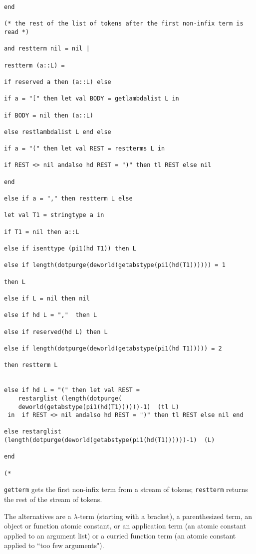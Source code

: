 \documentclass{article}
\begin{document}
\begin{verbatim}
end

(* the rest of the list of tokens after the first non-infix term is read *)

and restterm nil = nil |

restterm (a::L) = 

if reserved a then (a::L) else

if a = "[" then let val BODY = getlambdalist L in

if BODY = nil then (a::L)

else restlambdalist L end else

if a = "(" then let val REST = restterms L in

if REST <> nil andalso hd REST = ")" then tl REST else nil

end

else if a = "," then restterm L else

let val T1 = stringtype a in

if T1 = nil then a::L

else if isenttype (pi1(hd T1)) then L

else if length(dotpurge(deworld(getabstype(pi1(hd(T1)))))) = 1

then L

else if L = nil then nil

else if hd L = ","  then L

else if reserved(hd L) then L

else if length(dotpurge(deworld(getabstype(pi1(hd T1))))) = 2

then restterm L


else if hd L = "(" then let val REST = 
    restarglist (length(dotpurge(
    deworld(getabstype(pi1(hd(T1))))))-1)  (tl L)
 in  if REST <> nil andalso hd REST = ")" then tl REST else nil end

else restarglist (length(dotpurge(deworld(getabstype(pi1(hd(T1))))))-1)  (L)

end

(*

\end{verbatim}


{\tt getterm} gets the first non-infix term from a stream of tokens;  {\tt restterm} returns the rest of the stream of tokens.

The alternatives are a $\lambda$-term (starting with a bracket), a parenthesized term, an object or function atomic constant, or an application term (an atomic constant applied to an argument list)
or a curried function term (an atomic constant applied to ``too few arguments").
\end{document}
